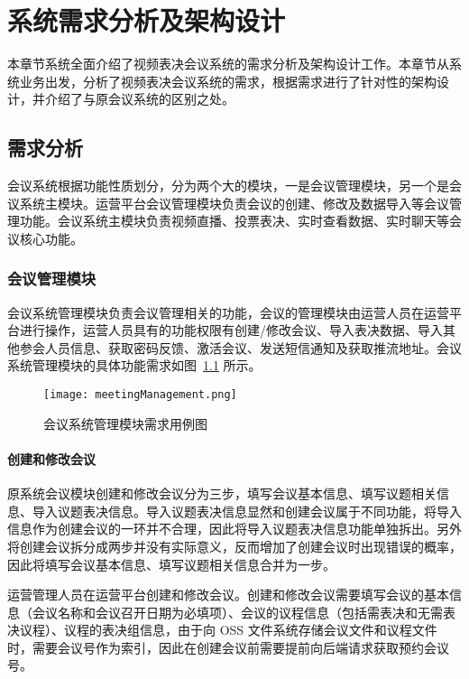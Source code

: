 
\chapter{系统需求分析及架构设计}
本章节系统全面介绍了视频表决会议系统的需求分析及架构设计工作。本章节从系统业务出发，分析了视频表决会议系统的需求，根据需求进行了针对性的架构设计，并介绍了与原会议系统的区别之处。

\section{需求分析}

会议系统根据功能性质划分，分为两个大的模块，一是会议管理模块，另一个是会议系统主模块。运营平台会议管理模块负责会议的创建、修改及数据导入等会议管理功能。会议系统主模块负责视频直播、投票表决、实时查看数据、实时聊天等会议核心功能。

\subsection{会议管理模块}

会议系统管理模块负责会议管理相关的功能，会议的管理模块由运营人员在运营平台进行操作，运营人员具有的功能权限有创建/修改会议、导入表决数据、导入其他参会人员信息、获取密码反馈、激活会议、发送短信通知及获取推流地址。会议系统管理模块的具体功能需求如图~\ref{fig:meetingManagement} 所示。

\begin{figure}[!htp]
  \centering
  \texttt{[image: meetingManagement.png]}
  \caption[管理模块]
    {会议系统管理模块需求用例图}
 \label{fig:meetingManagement}
\end{figure}

\subsubsection{创建和修改会议}
原系统会议模块创建和修改会议分为三步，填写会议基本信息、填写议题相关信息、导入议题表决信息。导入议题表决信息显然和创建会议属于不同功能，将导入信息作为创建会议的一环并不合理，因此将导入议题表决信息功能单独拆出。另外将创建会议拆分成两步并没有实际意义，反而增加了创建会议时出现错误的概率，因此将填写会议基本信息、填写议题相关信息合并为一步。

运营管理人员在运营平台创建和修改会议。创建和修改会议需要填写会议的基本信息（会议名称和会议召开日期为必填项）、会议的议程信息（包括需表决和无需表决议程）、议程的表决组信息，由于向 OSS 文件系统存储会议文件和议程文件时，需要会议号作为索引，因此在创建会议前需要提前向后端请求获取预约会议号。

